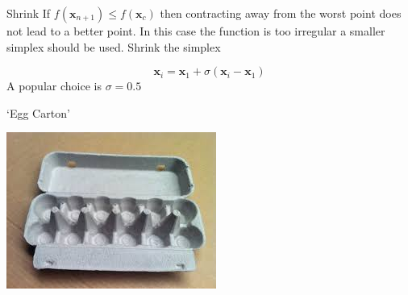 \documentclass[10pt]{beamer}
\begin{document}
                                                                                              \begin{frame}{Shrink}
                                                                                                If $f({\bm x_{n+1}})\leq f({\bm x_{c}})$ then contracting away from the worst point does not lead to a better point.  In this case the function is too irregular a smaller simplex should be used.  Shrink the simplex

                                                                                                \begin{equation}
                                                                                                  {\bm x_i}={\bm x_1}+\sigma({\bm x_i}-{\bm x_1})
                                                                                                \end{equation}
                                                                                                A popular choice is $\sigma=0.5$
                                                                                              \end{frame}
                                                                                              \begin{frame}{`Egg Carton'}
                                                                                                \begin{center}
                                                                                                  \includegraphics{eggcarton.jpeg}
                                                                                                \end{center}
                                                                                              \end{frame}
\end{document}
